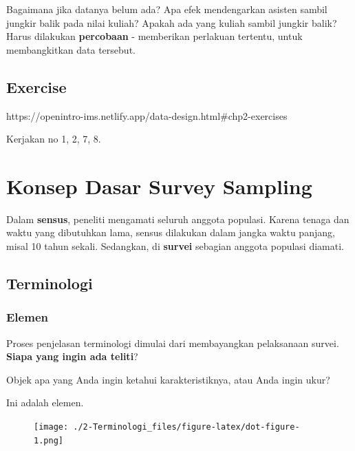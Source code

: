 \documentclass[
  letterpaper,
  DIV=11,
  numbers=noendperiod]{scrreprt}
\begin{document}
Bagaimana jika datanya belum ada? Apa efek mendengarkan asisten sambil
jungkir balik pada nilai kuliah? Apakah ada yang kuliah sambil jungkir
balik? Harus dilakukan \textbf{percobaan} - memberikan perlakuan
tertentu, untuk membangkitkan data tersebut.

\hypertarget{exercise}{%
\section{Exercise}\label{exercise}}

https://openintro-ims.netlify.app/data-design.html\#chp2-exercises

Kerjakan no 1, 2, 7, 8.


\hypertarget{konsep-dasar-survey-sampling}{%
\chapter{Konsep Dasar Survey
Sampling}\label{konsep-dasar-survey-sampling}}

Dalam \textbf{sensus}, peneliti mengamati seluruh anggota populasi.
Karena tenaga dan waktu yang dibutuhkan lama, sensus dilakukan dalam
jangka waktu panjang, misal 10 tahun sekali. Sedangkan, di
\textbf{survei} sebagian anggota populasi diamati.

\hypertarget{terminologi}{%
\section{Terminologi}\label{terminologi}}

\hypertarget{elemen}{%
\subsection{Elemen}\label{elemen}}

Proses penjelasan terminologi dimulai dari membayangkan pelaksanaan
survei. \textbf{Siapa yang ingin ada teliti}?

Objek apa yang Anda ingin ketahui karakteristiknya, atau Anda ingin
ukur?

Ini adalah elemen.

\begin{figure}[H]

{\centering \texttt{[image: ./2-Terminologi\_files/figure-latex/dot-figure-1.png]}

}

\end{figure}
\end{document}
